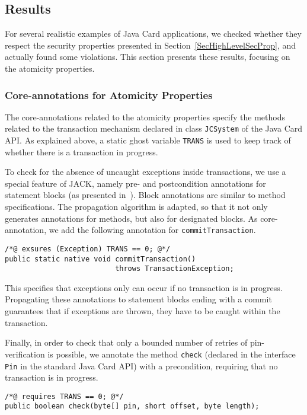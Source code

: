 \subsection{Results}\label{SecResults}

For several realistic examples of Java Card applications, we checked
whether they respect the security properties presented in
Section~\ref{SecHighLevelSecProp}, and actually found some violations.
This section presents these results, focusing on the atomicity
properties.

\subsubsection{Core-annotations for Atomicity Properties}

The core-annotations related to the atomicity properties specify the
methods related to the transaction mechanism declared in class
\texttt{JCSystem} of the Java Card API. As explained above, a static
ghost variable \texttt{TRANS} is used to keep track of whether there
is a transaction in progress.  


To check for the absence of uncaught exceptions inside transactions,
we use a special feature of JACK, namely pre- and postcondition
annotations for statement blocks (as presented
in~\cite{BRL-JACK}). Block annotations are  similar to method
specifications. The propagation algorithm is adapted, so that it not
only generates annotations for methods, but also for designated
blocks. As core-annotation, we add the following annotation for
\texttt{commitTransaction}. 
\begin{verbatim}
/*@ exsures (Exception) TRANS == 0; @*/
public static native void commitTransaction() 
                          throws TransactionException;
\end{verbatim}
This specifies that exceptions only can occur if no transaction is in
progress. Propagating these annotations to statement blocks ending
with a commit guarantees that if exceptions are thrown, they have to
be caught within the transaction.



Finally, in order to check that only a bounded number of retries of
pin-verification is possible, we annotate the method \texttt{check}
(declared in the interface \texttt{Pin} in the
standard Java Card API) with a precondition, requiring that no
transaction is in progress.
\begin{verbatim}
/*@ requires TRANS == 0; @*/
public boolean check(byte[] pin, short offset, byte length);
\end{verbatim}

